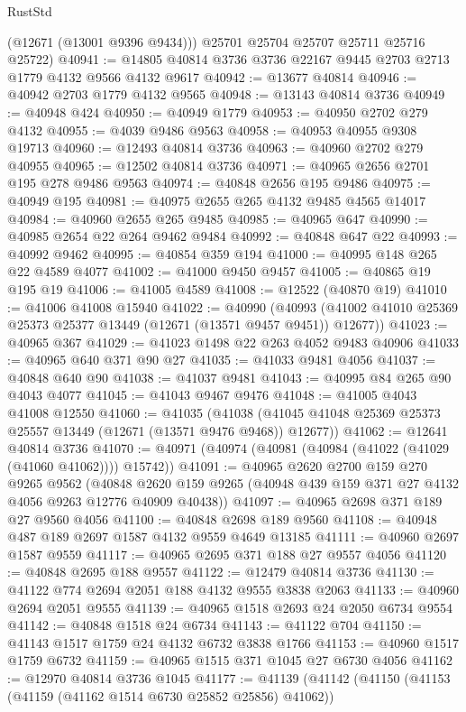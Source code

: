 \begin{lexlean}{RustStd}
\begin{coremodule}
        (@12671 (@13001 @9396 @9434)))
      @25701
      @25704
      @25707
      @25711
      @25716
      @25722)
@40941 := @14805 @40814 @3736 @3736 @22167 @9445 @2703 @2713 @1779 @4132 @9566 @4132 @9617
@40942 := @13677 @40814
@40946 := @40942 @2703 @1779 @4132 @9565
@40948 := @13143 @40814 @3736
@40949 := @40948 @424
@40950 := @40949 @1779
@40953 := @40950 @2702 @279 @4132
@40955 := @4039 @9486 @9563
@40958 := @40953 @40955 @9308 @19713
@40960 := @12493 @40814 @3736
@40963 := @40960 @2702 @279 @40955
@40965 := @12502 @40814 @3736
@40971 := @40965 @2656 @2701 @195 @278 @9486 @9563
@40974 := @40848 @2656 @195 @9486
@40975 := @40949 @195
@40981 := @40975 @2655 @265 @4132 @9485 @4565 @14017
@40984 := @40960 @2655 @265 @9485
@40985 := @40965 @647
@40990 := @40985 @2654 @22 @264 @9462 @9484
@40992 := @40848 @647 @22
@40993 := @40992 @9462
@40995 := @40854 @359 @194
@41000 := @40995 @148 @265 @22 @4589 @4077
@41002 := @41000 @9450 @9457
@41005 := @40865 @19 @195 @19
@41006 := @41005 @4589
@41008 := @12522 (@40870 @19)
@41010 := @41006 @41008 @15940
@41022 := @40990
    (@40993 (@41002 @41010 @25369 @25373 @25377 @13449 (@12671 (@13571 @9457 @9451)) @12677))
@41023 := @40965 @367
@41029 := @41023 @1498 @22 @263 @4052 @9483 @40906
@41033 := @40965 @640 @371 @90 @27
@41035 := @41033 @9481 @4056
@41037 := @40848 @640 @90
@41038 := @41037 @9481
@41043 := @40995 @84 @265 @90 @4043 @4077
@41045 := @41043 @9467 @9476
@41048 := @41005 @4043 @41008 @12550
@41060 := @41035
    (@41038 (@41045 @41048 @25369 @25373 @25557 @13449 (@12671 (@13571 @9476 @9468)) @12677))
@41062 := @12641 @40814 @3736
@41070 := @40971 (@40974 (@40981 (@40984 (@41022 (@41029 (@41060 @41062)))) @15742))
@41091 := @40965
    @2620
    @2700
    @159
    @270
    @9265
    @9562
    (@40848 @2620 @159 @9265 (@40948 @439 @159 @371 @27 @4132 @4056 @9263 @12776 @40909 @40438))
@41097 := @40965 @2698 @371 @189 @27 @9560 @4056
@41100 := @40848 @2698 @189 @9560
@41108 := @40948 @487 @189 @2697 @1587 @4132 @9559 @4649 @13185
@41111 := @40960 @2697 @1587 @9559
@41117 := @40965 @2695 @371 @188 @27 @9557 @4056
@41120 := @40848 @2695 @188 @9557
@41122 := @12479 @40814 @3736
@41130 := @41122 @774 @2694 @2051 @188 @4132 @9555 @3838 @2063
@41133 := @40960 @2694 @2051 @9555
@41139 := @40965 @1518 @2693 @24 @2050 @6734 @9554
@41142 := @40848 @1518 @24 @6734
@41143 := @41122 @704
@41150 := @41143 @1517 @1759 @24 @4132 @6732 @3838 @1766
@41153 := @40960 @1517 @1759 @6732
@41159 := @40965 @1515 @371 @1045 @27 @6730 @4056
@41162 := @12970 @40814 @3736 @1045
@41177 := @41139
    (@41142
      (@41150
        (@41153 (@41159 (@41162 @1514 @6730 @25852 @25856) @41062))

\end{coremodule}
\end{lexlean}
